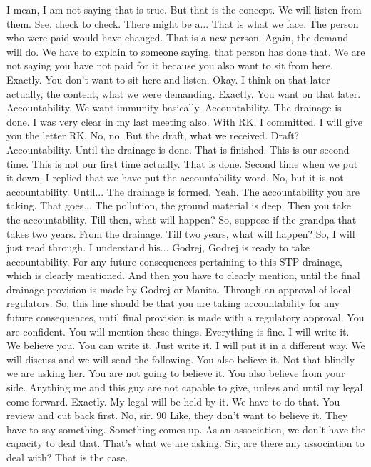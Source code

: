 I mean, I am not saying that is true.
But that is the concept.
We will listen from them.
See, check to check.
There might be a...
That is what we face.
The person who were paid would have changed.
That is a new person.
Again, the demand will do.
We have to explain to someone saying,
that person has done that.
We are not saying you have not paid for it
because you also want to sit from here.
Exactly.
You don't want to sit here and listen.
Okay.
I think on that later actually,
the content, what we were demanding.
Exactly.
You want on that later.
Accountability.
We want immunity basically.
Accountability.
The drainage is done.
I was very clear in my last meeting also.
With RK, I committed.
I will give you the letter RK.
No, no.
But the draft, what we received.
Draft?
Accountability.
Until the drainage is done.
That is finished.
This is our second time.
This is not our first time actually.
That is done.
Second time when we put it down,
I replied that we have put the accountability word.
No, but it is not accountability.
Until...
The drainage is formed.
Yeah.
The accountability you are taking.
That goes...
The pollution, the ground material is deep.
Then you take the accountability.
Till then, what will happen?
So, suppose if the grandpa that takes two years.
From the drainage.
Till two years, what will happen?
So, I will just read through.
I understand his...
Godrej, Godrej is ready to take accountability.
For any future consequences pertaining to this STP drainage,
which is clearly mentioned.
And then you have to clearly mention,
until the final drainage provision is made by Godrej or Manita.
Through an approval of local regulators.
So, this line should be that you are taking accountability
for any future consequences,
until final provision is made with a regulatory approval.
You are confident.
You will mention these things.
Everything is fine.
I will write it.
We believe you.
You can write it.
Just write it.
I will put it in a different way.
We will discuss and we will send the following.
You also believe it.
Not that blindly we are asking her.
You are not going to believe it.
You also believe from your side.
Anything me and this guy are not capable to give,
unless and until my legal come forward.
Exactly.
My legal will be held by it.
We have to do that.
You review and cut back first.
No, sir.
90%
Like, they don't want to believe it.
They have to say something.
Something comes up.
As an association, we don't have the capacity to deal that.
That's what we are asking.
Sir, are there any association to deal with?
That is the case.

